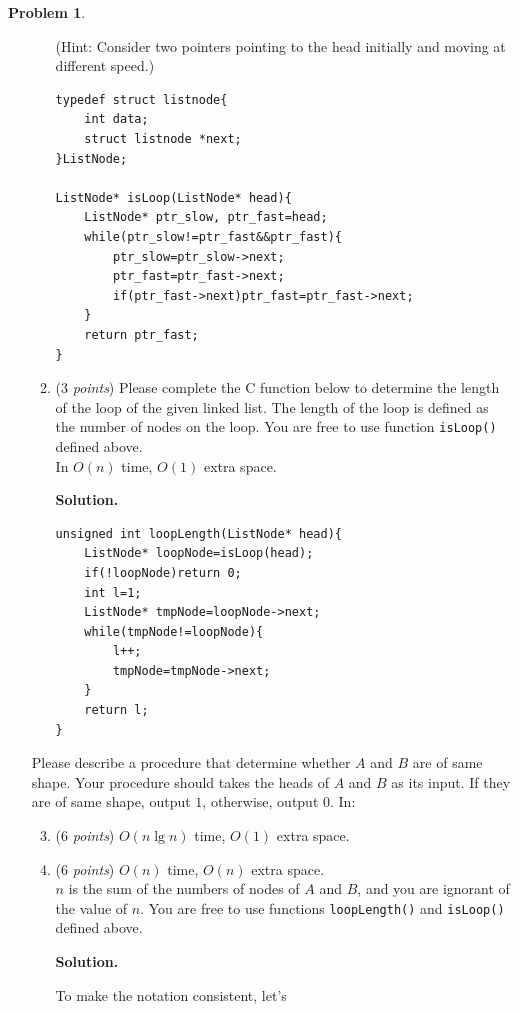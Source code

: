 \documentclass[12pt,a4paper]{report}
\newcommand{\points}[1]{ ($#1$ \textit{points}) }
\theoremstyle{definition}
\newtheorem{problem}{\textbf{Problem}}
\newcommand{\solution}{\textbf{Solution.}}
\theoremstyle{definition}
\begin{document}
\begin{problem}
\begin{enumerate}[label=\arabic*.]
\begin{enumerate}[label=\alph*.]
        (Hint: Consider two pointers pointing to the head initially and moving at different speed.)

\begin{lstlisting}[style=CStyle]
typedef struct listnode{
    int data;
    struct listnode *next;
}ListNode;

ListNode* isLoop(ListNode* head){
    ListNode* ptr_slow, ptr_fast=head;
    while(ptr_slow!=ptr_fast&&ptr_fast){
        ptr_slow=ptr_slow->next;
        ptr_fast=ptr_fast->next;
        if(ptr_fast->next)ptr_fast=ptr_fast->next;
    }
    return ptr_fast;
}
\end{lstlisting}

        \item \points{3}Please complete the C function below to determine the length of the loop of the given linked list. The length of the loop is defined as the number of nodes on the loop. You are free to use function \texttt{isLoop()} defined above.\\
        In $O(n)$ time, $O(1)$ extra space.

\solution

\begin{lstlisting}[style=CStyle]
unsigned int loopLength(ListNode* head){
    ListNode* loopNode=isLoop(head);
    if(!loopNode)return 0;
    int l=1;
    ListNode* tmpNode=loopNode->next;
    while(tmpNode!=loopNode){
        l++;
        tmpNode=tmpNode->next;
    }
    return l;
}
\end{lstlisting}
\end{enumerate}
        Please describe a procedure that determine whether $A$ and $B$ are of same shape. Your procedure should takes the heads of $A$ and $B$ as its input. If they are of same shape, output $1$, otherwise, output $0$. In:
\begin{enumerate}[label=\alph*.]
    \setcounter{enumii}{2}
        \item \points{6}$O(n \lg n)$ time, $O(1)$ extra space.
        \item \points{6}$O(n)$ time, $O(n)$ extra space.\\
    \noindent $n$ is the sum of the numbers of nodes of $A$ and $B$, and you are ignorant of the value of $n$. You are free to use functions \texttt{loopLength()} and \texttt{isLoop()} defined above.

\solution
    
    To make the notation consistent, let's 


\end{enumerate}
\end{enumerate}
\end{problem}
\end{document}
